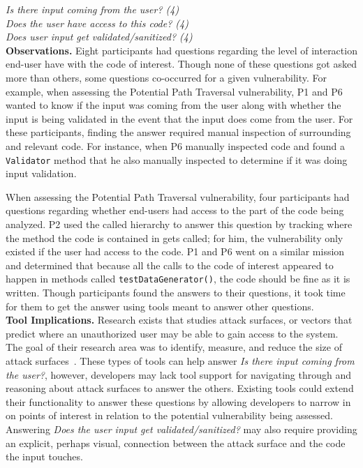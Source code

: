 \documentclass[conference]{IEEEtran}
\begin{document}
\noindent\emph{Is there input coming from the user? (4)} \\
\emph{Does the user have access to this code? (4)} \\
\emph{Does user input get validated/sanitized? (4)} \\


\noindent\textbf{Observations.}
Eight participants had questions regarding the level of interaction end-user have with the code of interest. 
Though none of these questions got asked more than others, some questions co-occurred for a given vulnerability.
For example, when assessing the Potential Path Traversal vulnerability, P1 and P6 wanted to know if the input was coming from the user along with whether the input is being validated in the event that the input does come from the user.
For these participants, finding the answer required manual inspection of surrounding and relevant code. 
For instance, when P6 manually inspected code and found a \texttt{Validator} method that he also manually inspected to determine if it was doing input validation.

When assessing the Potential Path Traversal vulnerability, four participants had questions regarding whether end-users had access to the part of the code being analyzed.
P2 used the called hierarchy to answer this question by tracking where the method the code is contained in gets called; for him, the vulnerability only existed if the user had access to the code.
P1 and P6 went on a similar mission and determined that because all the calls to the code of interest appeared to happen in methods called \texttt{testDataGenerator()}, the code should be fine as it is written.
Though participants found the answers to their questions, it took time for them to get the answer using tools meant to answer other questions.
\\

\noindent\textbf{Tool Implications.}
Research exists that studies attack surfaces, or vectors that predict where an unauthorized user may be able to gain access to the system.
The goal of their research area was to identify, measure, and reduce the size of attack surfaces~\cite{manadhata2011attack, bartel2012automatically}. These types of tools can help answer \textit{Is there input coming from the user?}, however, developers may lack tool support for navigating through and reasoning about attack surfaces to answer the others.
Existing tools could extend their functionality to answer these questions by allowing developers to narrow in on points of interest in relation to the potential vulnerability being assessed.
Answering \textit{Does the user input get validated/sanitized?} may also require providing an explicit, perhaps visual, connection between the attack surface and the code the input touches.
\end{document}
